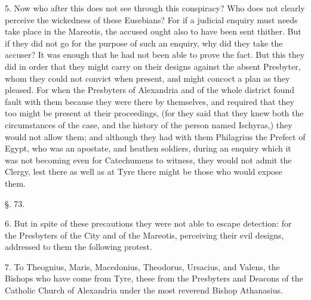 5. Now who after this does not see through this
conspiracy? Who does not clearly perceive the wickedness of these
Eusebians? For if a judicial enquiry must needs take place in the
Mareotis, the accused ought also to have been sent thither. But if
they did not go for the purpose of such an enquiry, why did they take
the accuser? It was enough that he had not been able to prove the
fact. But this they did in order that they might carry on their
designs against the absent Presbyter, whom they could not convict when
present, and might concoct a plan as they pleased. For when the
Presbyters of Alexandria and of the whole district found fault with
them because they were there by themselves, and required that they too
might be present at their proceedings, (for they said that they knew
both the circumstances of the case, and the history of the person
named Ischyras,) they would not allow them; and although they had with
them Philagrius the Prefect of Egypt, who was an apostate, and heathen
soldiers, during an enquiry which it was not becoming even for
Catechumens to witness, they would not admit the Clergy, lest there as
well as at Tyre there might be those who would expose them.

§. 73.

6. But in spite of these precautions they were
not able to escape detection: for the Presbyters of the City and of
the Mareotis, perceiving their evil designs, addressed to them the
following protest.

7. To Theognius, Maris, Macedonius, Theodorus,
Ursacius, and Valens, the Bishops who have come from Tyre, these from
the Presbyters and Deacons of the Catholic Church of Alexandria under
the most reverend Bishop Athanasius.

